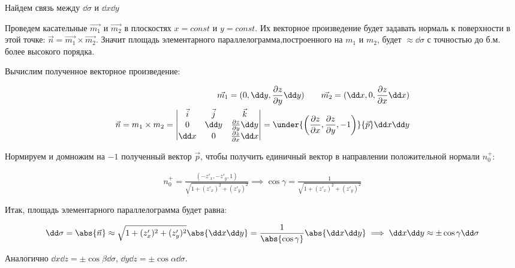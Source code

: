 \begin{remark}
  Найдем связь между \(\dd \sigma\) и \(\dd x \dd y\)

  
\end{remark}

Проведем касательные \(\vec{m_{1}}\) и \(\vec{m_{2}}\) в плоскостях
\(x = const\) и \(y = const\). Их векторное произведение будет задавать нормаль
к поверхности в этой точке:
\(\vec{n} = \vec{m_{1}} \times \vec{m_{2}}\). Значит площадь
элементарного параллелограмма,построенного на \(m_{1}\) и \(m_{2}\), будет
\(\approx \dd \sigma\) с точностью до б.м. более высокого порядка.

Вычислим полученное векторное произведение:

\begin{align*}
  \vec{m_{1}} = (0, \dd y, \frac{\partial z}{\partial y} \dd y)
  \qquad
  \vec{m_{2}} = (\dd x, 0, \frac{\partial z}{\partial x} \dd x)
  \\
  \vec{n}
  = m_{1} \times m_{2}
  = \begin{vmatrix}
    \vec{i} & \vec{j} & \vec{k} \\
    0 & \dd y & \frac{\partial z}{\partial y} \dd y \\
    \dd x & 0 & \frac{\partial z}{\partial x} \dd x \\
  \end{vmatrix}
  =
  \under{\left(
    \frac{\partial z}{\partial x},
    \frac{\partial z}{\partial y},
    -1
  \right)}{\vec{p}} \dd x \dd y
\end{align*}

Нормируем и домножим на \(-1\) полученный вектор \(\vec{p}\), чтобы получить
единичный вектор  в направлении положительной нормали \(n_{0}^{+}\):

\begin{align*}
  n_{0}^{+}
  = \frac{(-z'_{x}, -z'_{y}, 1)}{\sqrt{1 + (z'_{x})^2 + (z'_{y})^2}}
  \implies \cos \gamma = \frac{1}{{\sqrt{1 + (z'_{x})^2 + (z'_{y})^2}}}
\end{align*}

Итак, площадь элементарного параллелограмма будет равна:

\begin{align*}
  \dd \sigma
  = \abs{\vec{n}}
  \approx \sqrt{1 + (z'_{x})^2 + (z'_{y})^2} \abs{\dd x \dd y}
  = \frac{1}{\abs{\cos \gamma}} \abs{\dd x \dd y}
  \implies \dd x \dd y \approx \pm \cos \gamma \dd \sigma
\end{align*}

Аналогично \(\dd x \dd z = \pm \cos \beta \dd \sigma\),
\(\dd y \dd z = \pm \cos \alpha \dd \sigma\).

